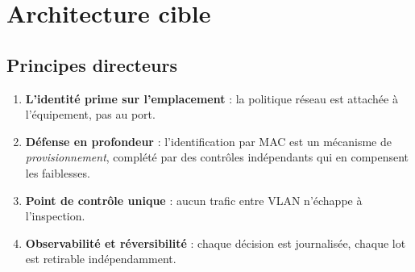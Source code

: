 \documentclass[11pt,a4paper]{article}
\begin{document}
\section{Architecture cible}

\subsection{Principes directeurs}
\begin{enumerate}[leftmargin=*,itemsep=1pt,topsep=2pt]
\item \textbf{L'identité prime sur l'emplacement} : la politique réseau est attachée à l'équipement, pas au port.
\item \textbf{Défense en profondeur} : l'identification par MAC est un mécanisme de \emph{provisionnement}, complété par des contrôles indépendants qui en compensent les faiblesses.
\item \textbf{Point de contrôle unique} : aucun trafic entre VLAN n'échappe à l'inspection.
\item \textbf{Observabilité et réversibilité} : chaque décision est journalisée, chaque lot est retirable indépendamment.
\end{enumerate}
\end{document}
